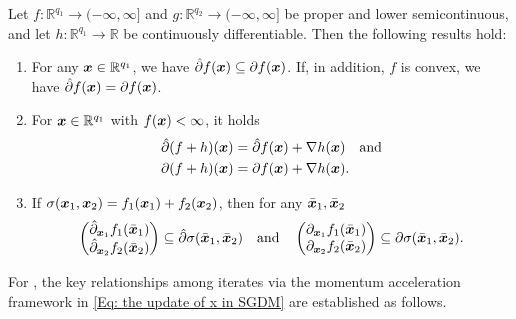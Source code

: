 \begin{proposition}
    Let $f : \mathbb{R}^{q_1}\rightarrow (-\infty, \infty]$ and $g : \mathbb{R}^{q_2}
    \rightarrow (-\infty, \infty]$ be proper and lower semicontinuous, and let
    $h : \mathbb{R}^{q_1}\rightarrow \mathbb{R}$ be continuously differentiable.
    Then the following results hold:
    \begin{enumerate}[label=(\roman{*})]
        \item For any $\bm{x} \in \mathbb{R}^{q_1}$, we have
            $\hat{\partial}f(\bm{x}) \subseteq \partial f(\bm{x})$. If, in addition, $f$
            is convex, we have $\hat{\partial}f(\bm{x}) = \partial f(\bm{x})$.

        \item For $\bm{x} \in \mathbb{R}^{q_1}$ with $f(\bm{x}) < \infty$, it holds
           \[
\begin{aligned}
    \hat{\partial}(f + h)(\bm{x}) &= \hat{\partial}f(\bm{x}) + \nabla h(\bm{x}) \quad \text{and}\\
    \partial (f + h)(\bm{x}) &= \partial f(\bm{x}) + \nabla h(\bm{x}).
\end{aligned}
\]
        \item If $\sigma(\bm{x}_{1}, \bm{x}_{2}) = f_{1}(\bm{x}_{1}) + f_{2}(\bm{x}_{2})$,
            then for any $\bar{\bm{x}}_{1}, \bar{\bm{x}}_{2}$
            \[
                \begin{pmatrix}
                    \hat{\partial}_{\bm{x}_1}f_{1}(\bar{\bm{x}}_{1}) \\
                    \hat{\partial}_{\bm{x}_2}f_{2}(\bar{\bm{x}}_{2})
                \end{pmatrix}
                \subseteq \hat{\partial}\sigma(\bar{\bm{x}}_{1}, \bar{\bm{x}}_{2}) \quad
                \text{and}\quad
                \begin{pmatrix}
                    \partial_{\bm{x}_1}f_{1}(\bar{\bm{x}}_{1}) \\
                    \partial_{\bm{x}_2}f_{2}(\bar{\bm{x}}_{2})
                \end{pmatrix}
                \subseteq \partial \sigma(\bar{\bm{x}}_{1}, \bar{\bm{x}}_{2}).
            \]
    \end{enumerate}
\end{proposition}
For , the key relationships among iterates via the momentum acceleration framework in \eqref{Eq: the update of x in SGDM} are established as follows.
